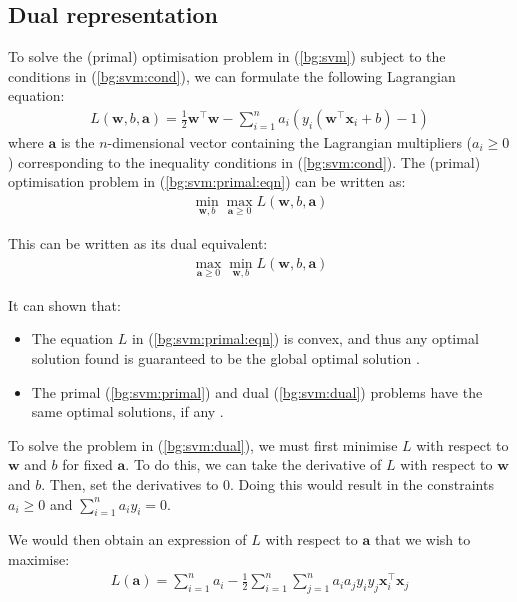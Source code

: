\documentclass[12pt, twoside, a4paper]{report}
\def\vec{\boldsymbol}
\begin{document}
\subsection{Dual representation}
To solve the (primal) optimisation problem in (\ref{bg:svm}) subject to the conditions in (\ref{bg:svm:cond}), we can formulate the following Lagrangian equation:
\begin{align}
L(\boldsymbol w, b, \boldsymbol a)
= \frac{1}{2} \boldsymbol w^\top \boldsymbol w - \sum_{i=1}^n a_i (y_i(\boldsymbol w^\top \boldsymbol x_i + b) - 1) \label{bg:svm:primal:eqn}
\end{align}
where $\boldsymbol a$ is the $n$-dimensional vector containing the Lagrangian multipliers ($a_i \geq 0$) corresponding to the inequality conditions in (\ref{bg:svm:cond}). The (primal) optimisation problem in (\ref{bg:svm:primal:eqn}) can be written as:
\begin{align}
\min_{\boldsymbol w, b} \max_{\boldsymbol a \geq 0} L(\boldsymbol w, b, \vec a) \label{bg:svm:primal}
\end{align}

This can be written as its dual equivalent:
\begin{align}
\max_{\vec a \geq 0} \min_{\vec w, b} L(\vec w, b, \vec a) \label{bg:svm:dual}
\end{align}

It can shown that:
\begin{itemize}
\item The equation $L$ in (\ref{bg:svm:primal:eqn}) is convex, and thus any optimal solution found is guaranteed to be the global optimal solution \cite{RefWorks:123}.
\item The primal (\ref{bg:svm:primal}) and dual (\ref{bg:svm:dual}) problems have the same optimal solutions, if any \cite{RefWorks:124}.
\end{itemize}

To solve the problem in (\ref{bg:svm:dual}), we must first minimise $L$ with respect to $\vec w$ and $b$ for fixed $\vec a$. To do this, we can take the derivative of $L$ with respect to $\vec w$ and $b$. Then, set the derivatives to 0. Doing this would result in the constraints $a_i \geq 0$ and $\sum_{i=1}^n a_i y_i = 0$.

We would then obtain an expression of $L$ with respect to $\vec a$ that we wish to maximise:
\begin{align*}
L(\vec a) = \sum_{i=1}^n a_i - \frac{1}{2} \sum_{i=1}^n \sum_{j=1}^n a_i a_j y_i y_j \vec{x}_i^\top \vec{x}_j
\end{align*}
\end{document}
